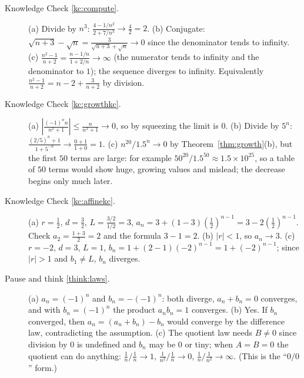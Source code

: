 \documentclass[11pt]{article}
\begin{document}
\begin{description}
  \item[Knowledge Check \ref{kc:compute}.] (a) Divide by $n^3$: $\frac{4-1/n^2}{2+7/n^3}\to\frac42=2$. (b) Conjugate: $\sqrt{n+3}-\sqrt n=\frac{3}{\sqrt{n+3}+\sqrt n}\to0$ since the denominator tends to infinity. (c) $\frac{n^2-1}{n+2}=\frac{n-1/n}{1+2/n}\to\infty$ (the numerator tends to infinity and the denominator to $1$); the sequence diverges to infinity. Equivalently $\frac{n^2-1}{n+2}=n-2+\frac3{n+2}$ by division.
  \item[Knowledge Check \ref{kc:growthkc}.] (a) $\left|\frac{(-1)^nn}{n^2+1}\right|\le\frac n{n^2+1}\to0$, so by squeezing the limit is $0$. (b) Divide by $5^n$: $\frac{(2/5)^n+1}{1+5^{-n}}\to\frac{0+1}{1+0}=1$. (c) $n^{20}/1.5^n\to0$ by Theorem~\ref{thm:growth}(b), but the first $50$ terms are large: for example $50^{20}/1.5^{50}\approx1.5\times10^{25}$, so a table of $50$ terms would show huge, growing values and mislead; the decrease begins only much later.
  \item[Knowledge Check \ref{kc:affinekc}.] (a) $r=\frac12$, $d=\frac32$, $L=\frac{3/2}{1/2}=3$, $a_n=3+(1-3)\left(\frac12\right)^{n-1}=3-2\left(\frac12\right)^{n-1}$. Check $a_2=\frac{1+3}2=2$ and the formula $3-1=2$. (b) $|r|<1$, so $a_n\to3$. (c) $r=-2$, $d=3$, $L=1$, $b_n=1+(2-1)(-2)^{n-1}=1+(-2)^{n-1}$; since $|r|>1$ and $b_1\ne L$, $b_n$ diverges.
  \item[Pause and think \ref{think:laws}.] (a) $a_n=(-1)^n$ and $b_n=-(-1)^n$: both diverge, $a_n+b_n=0$ converges, and with $b_n=(-1)^n$ the product $a_nb_n=1$ converges. (b) Yes. If $b_n$ converged, then $a_n=(a_n+b_n)-b_n$ would converge by the difference law, contradicting the assumption. (c) The quotient law needs $B\ne0$ since division by $0$ is undefined and $b_n$ may be $0$ or tiny; when $A=B=0$ the quotient can do anything: $\frac1n\big/\frac1n\to1$, $\frac1{n^2}\big/\frac1n\to0$, $\frac1n\big/\frac1{n^2}\to\infty$. (This is the ``$0/0$'' form.)

\end{description}
\end{document}
